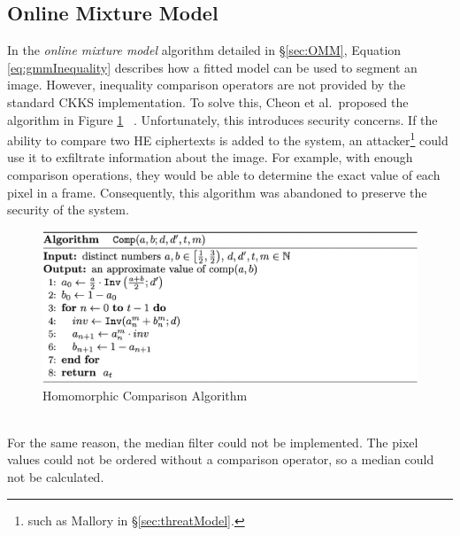 \subsection{Online Mixture Model}
\setlength{\leftskip}{0.5cm}
\indent \indent
In the \textit{online mixture model} algorithm detailed in §\ref{sec:OMM}, Equation \ref{eq:gmmInequality} describes how a fitted model can be used to segment an image. However, inequality comparison operators are not provided by the standard CKKS implementation. To solve this, Cheon et al.\ proposed the algorithm in Figure \ref{fig:comparison} ~\cite{Comparison}. Unfortunately, this introduces security concerns. If the ability to compare two HE ciphertexts is added to the system, an attacker\footnote{such as Mallory in §\ref{sec:threatModel}.} could use it to exfiltrate information about the image. For example, with enough comparison operations, they would be able to determine the exact value of each pixel in a frame. Consequently, this algorithm was abandoned to preserve the security of the system.
\begin{figure}[ht]
    \centering
    \includegraphics[width=\textwidth]{figures/algorithm1}
    \caption{Homomorphic Comparison Algorithm}
    \label{fig:comparison}
\end{figure}
\smallskip \\ \indent
For the same reason, the median filter could not be implemented. The pixel values could not be ordered without a comparison operator, so a median could not be calculated.


\setlength{\leftskip}{0cm}
